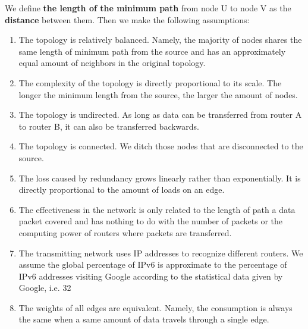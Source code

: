 \documentclass{mcmthesis}
\begin{document}
We define \textbf{the length of the minimum path} from node U to node V as the \textbf{distance} between them. Then we make the following assumptions:

\begin{enumerate}[ \quad(1)]
	\item The topology is relatively balanced. Namely, the majority of nodes shares the same length of minimum path from the source and has an approximately equal amount of neighbors in the original topology.
	\item The complexity of the topology is directly proportional to its scale. The longer the minimum length from the source, the larger the amount of nodes.
	\item The topology is undirected. As long as data can be transferred from router A to router B, it can also be transferred backwards.
	\item The topology is connected. We ditch those nodes that are disconnected to the source.
	\item The loss caused by redundancy grows linearly rather than exponentially. It is directly proportional to the amount of loads on an edge.
	\item The effectiveness in the network is only related to the length of path a data packet covered and has nothing to do with the number of packets or the computing power of routers where packets are transferred.
	\item The transmitting network uses IP addresses to recognize different routers. We assume the global percentage of IPv6 is approximate to the percentage of IPv6 addresses visiting Google according to the statistical data given by Google, i.e. 32%
	\item The weights of all edges are equivalent. Namely, the consumption is always the same when a same amount of data travels through a single edge.

\end{enumerate}
\end{document}

